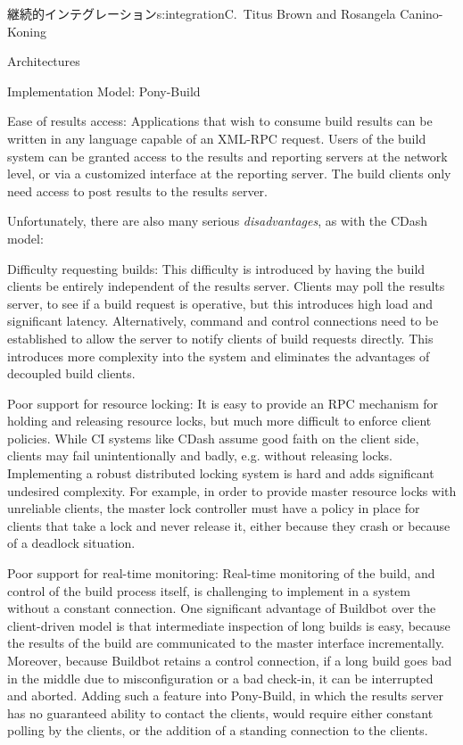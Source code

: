 \begin{aosachapter}{継続的インテグレーション}{s:integration}{C.\ Titus Brown and Rosangela Canino-Koning}
\begin{aosasect1}{Architectures}
\begin{aosasect2}{Implementation Model: Pony-Build}
\begin{aosadescription}
  \item{Ease of results access:} Applications that wish to
  consume build results can be written in any language capable of an
  XML-RPC request. Users of the build system can be granted access
  to the results and reporting servers at the network level, or via
  a customized interface at the reporting server. The build clients
  only need access to post results to the results server.

\end{aosadescription}

Unfortunately, there are also many serious \emph{disadvantages}, as
with the CDash model:

\begin{aosadescription}

  \item{Difficulty requesting builds:} This difficulty is
  introduced by having the build clients be entirely independent of
  the results server. Clients may poll the results server, to see if
  a build request is operative, but this introduces high load and
  significant latency. Alternatively, command and control
  connections need to be established to allow the server to notify
  clients of build requests directly. This introduces more
  complexity into the system and eliminates the advantages of
  decoupled build clients.

  \item{Poor support for resource locking:} It is easy to
  provide an RPC mechanism for holding and releasing resource locks,
  but much more difficult to enforce client policies. While CI
  systems like CDash assume good faith on the client side, clients
  may fail unintentionally and badly, e.g. without releasing
  locks. Implementing a robust distributed locking system is hard
  and adds significant undesired complexity. For example, in order
  to provide master resource locks with unreliable clients, the
  master lock controller must have a policy in place for clients
  that take a lock and never release it, either because they crash
  or because of a deadlock situation.

  \item{Poor support for real-time monitoring:} Real-time
  monitoring of the build, and control of the build process
  itself, is challenging to implement in a system without a constant
  connection. One significant advantage of Buildbot over the
  client-driven model is that intermediate inspection of long builds
  is easy, because the results of the build are communicated to the
  master interface incrementally. Moreover, because Buildbot retains
  a control connection, if a long build goes bad in the middle
  due to misconfiguration or a bad check-in, it can be interrupted
  and aborted. Adding such a feature into Pony-Build, in which the
  results server has no guaranteed ability to contact the clients,
  would require either constant polling by the clients, or the
  addition of a standing connection to the clients.


\end{aosadescription}
\end{aosasect2}
\end{aosasect1}
\end{aosachapter}
